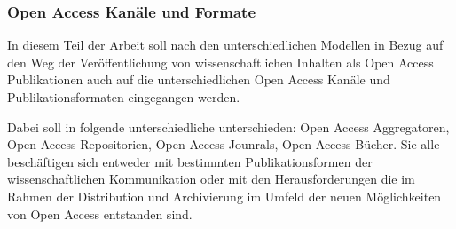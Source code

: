 \subsubsection{Open Access Kanäle und Formate}
In diesem Teil der Arbeit soll nach den unterschiedlichen Modellen in Bezug auf den Weg der Veröffentlichung von wissenschaftlichen Inhalten als Open Access Publikationen auch auf die unterschiedlichen Open Access Kanäle und Publikationsformaten eingegangen werden.

Dabei soll in folgende unterschiedliche unterschieden: Open Access Aggregatoren, Open Access Repositorien, Open Access Jounrals, Open Access Bücher. Sie alle beschäftigen sich entweder mit bestimmten Publikationsformen der wissenschaftlichen Kommunikation oder mit den Herausforderungen die im Rahmen der Distribution und Archivierung im Umfeld der neuen Möglichkeiten von Open Access entstanden sind. 